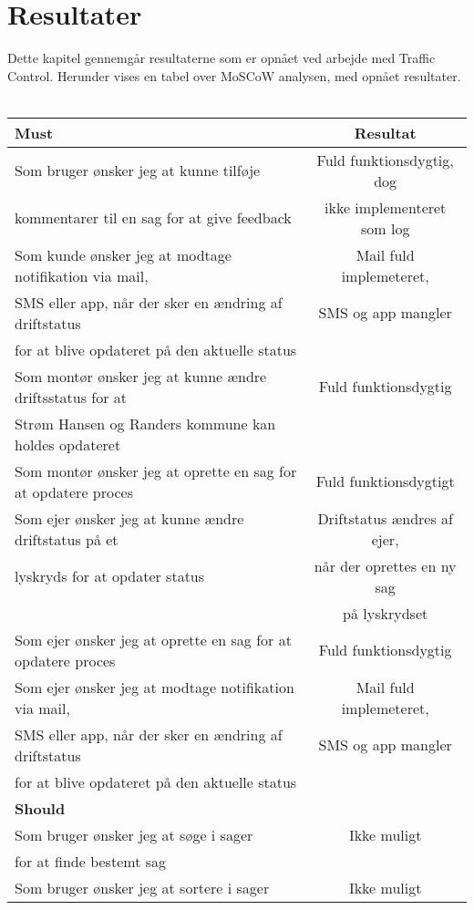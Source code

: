 \chapter{Resultater}
Dette kapitel gennemgår resultaterne som er opnået ved arbejde med Traffic Control. Herunder vises en tabel over MoSCoW analysen, med opnået resultater.\\ \\
\begin{tabular}{ l | c  }
	\hline
	\textbf{Must} & \textbf{Resultat} \\ \hline
	Som bruger ønsker jeg at kunne tilføje & Fuld funktionsdygtig, dog\\
	kommentarer til en sag for at give feedback & ikke implementeret som log\\ 
	\hline
	Som kunde ønsker jeg at modtage notifikation via mail, & Mail fuld implemeteret,\\
	SMS eller app, når der sker en ændring af driftstatus & SMS og app mangler\\
	for at blive opdateret på den aktuelle status & \\
	\hline
	Som montør ønsker jeg at kunne ændre driftsstatus for at & Fuld funktionsdygtig\\
	Strøm Hansen og Randers kommune kan holdes opdateret & \\
	\hline
	Som montør ønsker jeg at oprette en sag for at opdatere proces & Fuld funktionsdygtigt\\
	\hline
	Som ejer ønsker jeg at kunne ændre driftstatus på et & Driftstatus ændres af ejer,\\
	lyskryds for at opdater status & når der oprettes en ny sag\\
	 & på lyskrydset\\
	\hline
	Som ejer ønsker jeg at oprette en sag for at opdatere proces & Fuld funktionsdygtig\\
	\hline
	Som ejer ønsker jeg at modtage notifikation via mail, & Mail fuld implemeteret,\\
	SMS eller app, når der sker en ændring af driftstatus & SMS og app mangler\\
	for at blive opdateret på den aktuelle status &\\ 
	\hline
	\textbf{Should} & \\ \hline
	Som bruger ønsker jeg at søge i sager & Ikke muligt\\
	for at finde bestemt sag &\\
	\hline
	Som bruger ønsker jeg at sortere i sager & Ikke muligt\\

\end{tabular}
